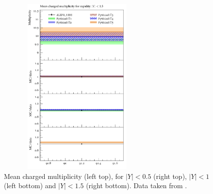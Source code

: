 \documentclass[aps,preprint,floatfix,nofootinbib,showpacs]{revtex4-1}
\begin{document}
\begin{figure}[btp]
 \hfill
  \includegraphics[width=8cm, height=9cm]{ALEPH_1996/d22-x01-y01.pdf}
  \caption{Mean charged multiplicity (left top), for $|Y| < 0.5$ (right top), $|Y| < 1$ (left bottom)
  and $|Y| < 1.5$ (right bottom). Data taken from \cite{Barate:1996fi}.}
  \label{Fig-2}
 \end{figure} 
 
\end{document}
